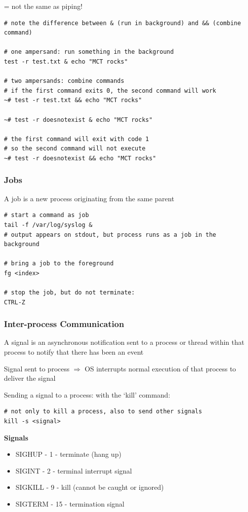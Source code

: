 \documentclass{article}
\begin{document}
= not the same as piping!

\begin{verbatim}
# note the difference between & (run in background) and && (combine command)

# one ampersand: run something in the background
test -r test.txt & echo "MCT rocks"

# two ampersands: combine commands
# if the first command exits 0, the second command will work
~# test -r test.txt && echo "MCT rocks"

~# test -r doesnotexist & echo "MCT rocks"

# the first command will exit with code 1
# so the second command will not execute
~# test -r doesnotexist && echo "MCT rocks"
\end{verbatim}

\subsubsection{Jobs}

A job is a new process originating from the same parent

\begin{verbatim}
# start a command as job
tail -f /var/log/syslog &
# output appears on stdout, but process runs as a job in the background

# bring a job to the foreground
fg <index>

# stop the job, but do not terminate:
CTRL-Z
\end{verbatim}


\subsubsection{Inter-process Communication}

A signal is an asynchronous notification sent to a process or thread within that process
to notify that there has been an event

Signal sent to process $\Rightarrow$ OS interrupts normal execution of that process to deliver the signal

Sending a signal to a process: with the `kill' command:

\begin{verbatim}
# not only to kill a process, also to send other signals
kill -s <signal>
\end{verbatim}

\textbf{Signals}

\begin{itemize}
    \item SIGHUP - 1 - terminate (hang up)
    \item SIGINT - 2 - terminal interrupt signal
    \item SIGKILL - 9 - kill (cannot be caught or ignored)
    \item SIGTERM - 15 - termination signal
\end{itemize}
\end{document}
